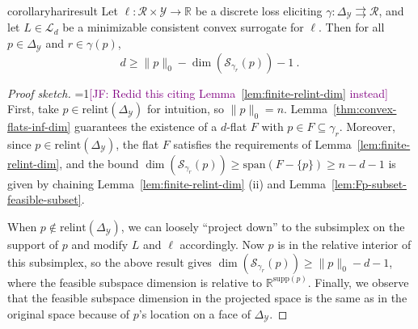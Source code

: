 \documentclass[anon,12pt]{colt2021} %
\newcommand{\Comments}{1}
\newcommand{\mynote}[2]{\ifnum\Comments=1\textcolor{#1}{#2}\fi}
\newcommand{\mytodo}[2]{\ifnum\Comments=1%
	\todo[linecolor=#1!80!black,backgroundcolor=#1,bordercolor=#1!80!black]{#2}\fi}
\newcommand{\jessie}[1]{\mynote{purple}{[JF: #1]}}
\newcommand{\jessiet}[1]{\mytodo{purple!20!white}{JF: #1}}
\newcommand{\bo}[1]{\mynote{blue}{[Bo: #1]}}
\newcommand{\btw}[1]{\mytodo{orange!80!white}{BTW: #1}}
\newcommand{\reals}{\mathbb{R}}
\newcommand{\simplex}{\Delta_\Y}
\newcommand{\relint}[1]{\mathrm{relint}(#1)}
\newcommand{\ccdim}{\mathrm{cc\,dim}}
\newcommand{\supp}{\mathrm{supp}}
\newcommand{\spn}{\mathrm{span}}
\newcommand{\codim}{\mathrm{codim}}
\renewcommand{\L}{\mathcal{L}}
\newcommand{\R}{\mathcal{R}}
\newcommand{\Sc}{\mathcal{S}}  %
\newcommand{\Y}{\mathcal{Y}}
\newcommand{\toto}{\rightrightarrows}
\begin{document}
\begin{restatable}{corollary}{hariresult}\label{cor:fsd-bound}
	Let $\ell:\R \times \Y \to \reals$ be a discrete loss eliciting $\gamma:\simplex \toto \R$, and let $L \in \L_d$ be a minimizable consistent convex surrogate for $\ell$.
	Then for all $p \in \simplex$ and $r \in \gamma(p)$,
	\begin{equation}
	  d \geq \|p\|_0 - \dim(\Sc_{\gamma_r}(p)) - 1~.~
	\end{equation}
\end{restatable}
\begin{proof}[Proof sketch]
	\jessie{Redid this citing Lemma~\ref{lem:finite-relint-dim} instead}
	First, take $p \in \relint{\simplex}$ for intuition, so $\|p\|_0 = n$.
	Lemma~\ref{thm:convex-flats-inf-dim} guarantees the existence of a $d$-flat $F$ with $p \in F \subseteq \gamma_r$.
	Moreover, since $p \in \relint{\simplex}$, the flat $F$ satisfies the requirements of Lemma~\ref{lem:finite-relint-dim}, and the bound $\dim(\Sc_{\gamma_r}(p)) \geq \spn(F - \{p\}) \geq n - d- 1$ is given by chaining Lemma~\ref{lem:finite-relint-dim} (ii) and Lemma~\ref{lem:Fp-subset-feasible-subset}.

	When $p \not \in \relint{\simplex}$, we can loosely ``project down'' to the subsimplex on the support of $p$ and modify $L$ and $\ell$ accordingly.
	Now $p$ is in the relative interior of this subsimplex, so the above result gives $\dim(\Sc_{\gamma_r}(p)) \geq \|p\|_0 - d - 1$, where the feasible subspace dimension is relative to $\reals^{\supp(p)}$.
	Finally, we observe that the feasible subspace dimension in the projected space is the same as in the original space because of $p$'s location on a face of $\simplex$.
\end{proof}
\end{document}
